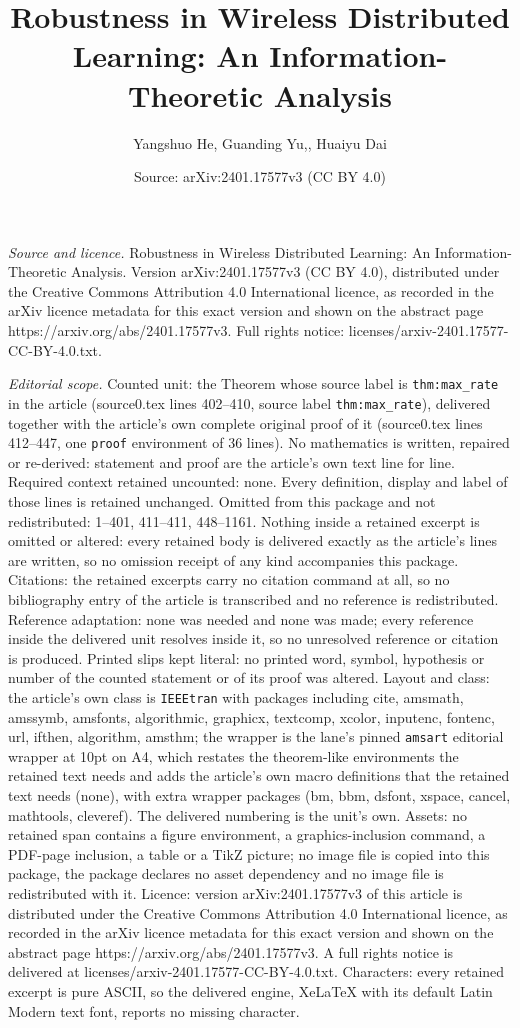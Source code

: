 \documentclass[10pt,a4paper]{amsart}
\title[Robustness in Wireless Distributed Learning: An Information-]{Robustness in Wireless Distributed Learning: An Information-Theoretic Analysis}
\author{Yangshuo He, Guanding Yu,, Huaiyu Dai}
\date{Source: arXiv:2401.17577v3 (CC BY 4.0)}
\begin{document}
\maketitle

\noindent\emph{Source and licence.} Robustness in Wireless Distributed Learning: An Information-Theoretic Analysis. Version arXiv:2401.17577v3 (CC BY 4.0), distributed under the Creative Commons Attribution 4.0 International licence, as recorded in the arXiv licence metadata for this exact version and shown on the abstract page https://arxiv.org/abs/2401.17577v3. Full rights notice: licenses/arxiv-2401.17577-CC-BY-4.0.txt.\par\smallskip

\noindent\textit{Editorial scope.} Counted unit: the Theorem whose source label is \texttt{thm:max\_rate} in the article (source0.tex lines 402--410, source label \texttt{thm:max\_rate}), delivered together with the article's own complete original proof of it (source0.tex lines 412--447, one \texttt{proof} environment of 36 lines). No mathematics is written, repaired or re-derived: statement and proof are the article's own text line for line. Required context retained uncounted: none. Every definition, display and label of those lines is retained unchanged. Omitted from this package and not redistributed: 1--401, 411--411, 448--1161. Nothing inside a retained excerpt is omitted or altered: every retained body is delivered exactly as the article's lines are written, so no omission receipt of any kind accompanies this package. Citations: the retained excerpts carry no citation command at all, so no bibliography entry of the article is transcribed and no reference is redistributed. Reference adaptation: none was needed and none was made; every reference inside the delivered unit resolves inside it, so no unresolved reference or citation is produced. Printed slips kept literal: no printed word, symbol, hypothesis or number of the counted statement or of its proof was altered. Layout and class: the article's own class is \texttt{IEEEtran} with packages including cite, amsmath, amssymb, amsfonts, algorithmic, graphicx, textcomp, xcolor, inputenc, fontenc, url, ifthen, algorithm, amsthm; the wrapper is the lane's pinned \texttt{amsart} editorial wrapper at 10pt on A4, which restates the theorem-like environments the retained text needs and adds the article's own macro definitions that the retained text needs (none), with extra wrapper packages (bm, bbm, dsfont, xspace, cancel, mathtools, cleveref). The delivered numbering is the unit's own. Assets: no retained span contains a figure environment, a graphics-inclusion command, a PDF-page inclusion, a table or a TikZ picture; no image file is copied into this package, the package declares no asset dependency and no image file is redistributed with it. Licence: version arXiv:2401.17577v3 of this article is distributed under the Creative Commons Attribution 4.0 International licence, as recorded in the arXiv licence metadata for this exact version and shown on the abstract page https://arxiv.org/abs/2401.17577v3. A full rights notice is delivered at licenses/arxiv-2401.17577-CC-BY-4.0.txt. Characters: every retained excerpt is pure ASCII, so the delivered engine, XeLaTeX with its default Latin Modern text font, reports no missing character.
\end{document}
